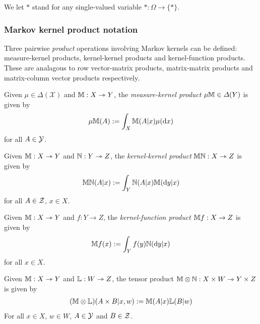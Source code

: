 \begin{definition}\label{no:single_valued}
We let $*$ stand for any single-valued variable $*:\Omega\to \{*\}$.
\end{definition}

\subsubsection{Markov kernel product notation}\label{ssec:product_notation}

Three pairwise \emph{product} operations involving Markov kernels can be defined: measure-kernel products, kernel-kernel products and kernel-function products. These are analagous to row vector-matrix products, matrix-matrix products and matrix-column vector products respectively.

\begin{definition}
Given $\mu\in \Delta(\mathcal{X})$ and $\mathbb{M}:X\rightarrowtriangle Y$, the \emph{measure-kernel product} $\mu\mathbb{M}\in \Delta(Y)$ is given by
\begin{align}
\mu\mathbb{M} (A) := \int_X \mathbb{M}(A|x) \mu(\mathrm{d}x)
\end{align}
for all $A\in \mathcal{Y}$.
\end{definition}

\begin{definition}\label{def:kproduct}
Given $\mathbb{M}:X\rightarrowtriangle Y$ and $\mathbb{N}:Y\rightarrowtriangle Z$, the \emph{kernel-kernel product} $\mathbb{M}\mathbb{N}:X\rightarrowtriangle Z$ is given by
\begin{align}
\mathbb{MN} (A|x) := \int_Y \mathbb{N}(A|x) \mathbb{M}(\mathrm{d}y|x)
\end{align}
for all $A\in \mathcal{Z}$, $x\in X$.
\end{definition}

\begin{definition}
Given $\mathbb{M}:X\rightarrowtriangle Y$ and $f:Y\to Z$, the \emph{kernel-function product} $\mathbb{M}f:X\to Z$ is given by
\begin{align}
\mathbb{M}f (x) := \int_Y f(y)\mathbb{N}(\mathrm{d}y|x)
\end{align}
for all $x\in X$.
\end{definition}

\begin{definition}
Given $\mathbb{M}:X\rightarrowtriangle Y$ and $\mathbb{L}:W\rightarrowtriangle Z$, the tensor product $\mathbb{M}\otimes\mathbb{N}:X\times W\rightarrowtriangle Y\times Z$ is given by
\begin{align}
	(\mathbb{M}\otimes\mathbb{L})(A\times B|x,w):=\mathbb{M}(A|x)\mathbb{L}(B|w)
\end{align}
For all $x\in X$, $w\in W$, $A\in \mathcal{Y}$ and $B\in \mathcal{Z}$.
\end{definition}

